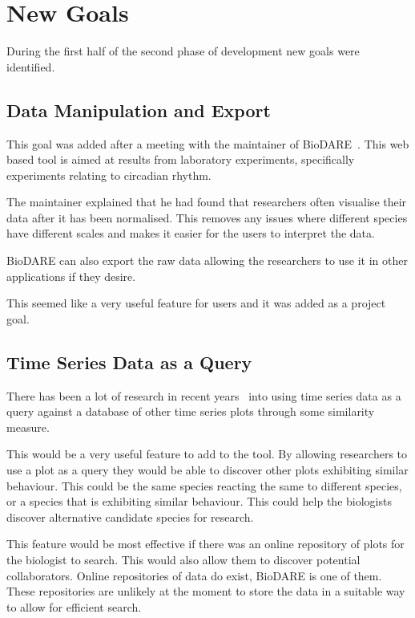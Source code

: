 \section{New Goals}
During the first half of the second phase of development new goals were identified.

\subsection{Data Manipulation and Export}

This goal was added after a meeting with the maintainer of BioDARE~\cite{biodare}.  This web based tool is aimed at results from laboratory experiments, specifically experiments relating to circadian rhythm.

The maintainer explained that he had found that researchers often visualise their data after it has been normalised.  This removes any issues where different species have different scales and makes it easier for the users to interpret the data.

BioDARE can also export the raw data allowing the researchers to use it in other applications if they desire.

This seemed like a very useful feature for users and it was added as a project goal.

\subsection{Time Series Data as a Query}

There has been a lot of research in recent years~\cite{esling, chotirat, agrawal, nakamura, goldin, structural_similarity, faloutsos, chakrabarti, popivanov, keogh, faloutsos2, bollobas, kahveci} into using time series data as a query against a database of other time series plots through some similarity measure.

This would be a very useful feature to add to the tool.  By allowing researchers to use a plot as a query they would be able to discover other plots exhibiting similar behaviour.  This could be the same species reacting the same to different species, or a species that is exhibiting similar behaviour.  This could help the biologists discover alternative candidate species for research.

This feature would be most effective if there was an online repository of plots for the biologist to search.  This would also allow them to discover potential collaborators.  Online repositories of data do exist, BioDARE is one of them.  These repositories are unlikely at the moment to store the data in a suitable way to allow for efficient search.

